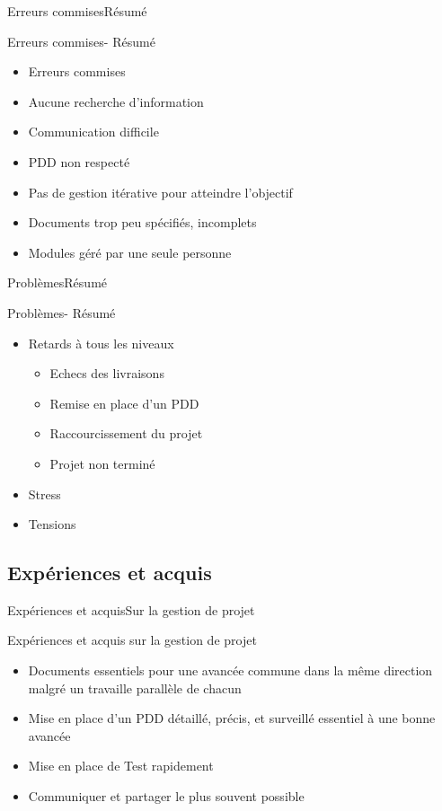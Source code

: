 		\begin{frame}{Erreurs commises}{Résumé}
	    	\begin{block}{Erreurs commises- Résumé}
	    		\begin{itemize}
					\item<1-> Erreurs commises 
					\item<2-> Aucune recherche d’information
					\item<3-> Communication difficile
					\item<4-> PDD non respecté 
					\item<5-> Pas de gestion itérative pour atteindre l’objectif
					\item<6-> Documents trop peu spécifiés, incomplets
					\item<7-> Modules géré par une seule personne
	    		\end{itemize}
	    	\end{block}
	    \end{frame}

	    \begin{frame}{Problèmes}{Résumé}
	    	\begin{block}{Problèmes- Résumé}
	    		\begin{itemize}
					\item<1-> Retards à tous les niveaux
					\begin{itemize}
						\item<2-> Echecs des livraisons
						\item<3-> Remise en place d’un PDD
						\item<4-> Raccourcissement du projet
						\item<5-> Projet non terminé
					\end{itemize}
					\item<6-> Stress
					\item<7-> Tensions
	    		\end{itemize}
	    	\end{block}
	    \end{frame}

	\subsection{Expériences et acquis}
	    \begin{frame}{Expériences et acquis}{Sur la gestion de projet}
	    	\begin{block}{Expériences et acquis sur la gestion de projet}
	    		\begin{itemize}
	    			\item<1-> Documents essentiels pour une avancée commune dans la même direction malgré un travaille parallèle de chacun
					
					\item<2-> Mise en place d'un PDD détaillé, précis, et surveillé essentiel à une bonne avancée
					\item<3-> Mise en place de Test rapidement 
					\item<4-> Communiquer et partager le plus souvent possible
	    		\end{itemize}
	    	\end{block}
	    \end{frame}

